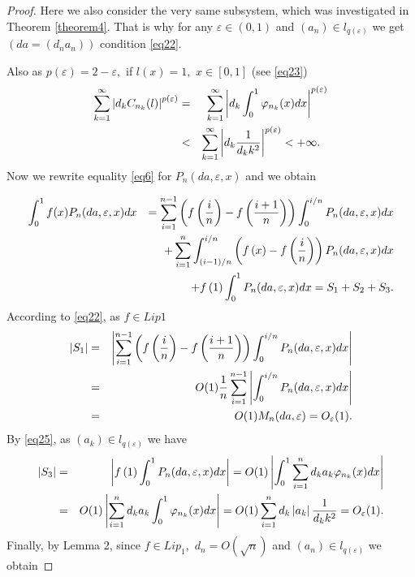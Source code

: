 \documentclass{publmathdeb}
\begin{document}
	\begin{proof}
		Here we also consider the very same subsystem, which was investigated in Theorem \ref{theorem4}. That is why for any $\varepsilon \in (0,1)$  and  $(a_n)\in l_{q(\varepsilon)}$ we get $(da=(d_n a_n))$ condition \eqref{eq22}.
		
		
		Also as $p(\varepsilon)=2-\varepsilon,$  if $l(x)=1,$ $x\in [0,1]$  (see \eqref{eq23})
		\begin{eqnarray}
			\label{eq25}  \sum_{k=1}^{\infty} \left|d_k C_{n_k} (l) \right|^{p(\varepsilon)} &=& \sum_{k=1}^{\infty} \left|d_k \int_{0}^{1} \varphi_{n_{k}}(x) dx \right|^{p(\varepsilon)} \\
			&<& \sum_{k=1}^{\infty} \left|d_k \frac{1}{d_k k^2}\right|^{p(\varepsilon)} < +\infty. \notag\ \ 
		\end{eqnarray} 
		Now we rewrite equality \eqref{eq6} for $P_n (da,\varepsilon,x)$  and we obtain
		
		\begin{eqnarray}
			\label{eq26} \int_{0}^{1} f(x) P_n (d a, \varepsilon, x) dx 
			&&= \sum_{i=1}^{n-1}\left(f\left(\frac{i}{n}\right)-f\left(\frac{i+1}{n}\right)\right)\int_{0}^{i/n}P_n(da, \varepsilon, x)dx \notag  \\
			&&+ \sum_{i=1}^{n}\int_{\left(i-1\right)/n}^{i/n}\left(f\left(x\right) -f\left(\frac{i}{n}\right)\right)P_n(da, \varepsilon, x) dx    \\
			&&+ f\left(1\right)\int_{0}^{1}P_n(da, \varepsilon, x)dx=S_1 +S_2 +S_3.  \notag  
		\end{eqnarray}
		According to \eqref{eq22}, as $f\in Lip1$ 
		\begin{eqnarray} \label{eq27}
			\left|S_1\right| &=& \left|\sum_{i=1}^{n-1}\left(f\left(\frac{i}{n}\right)-f\left(\frac{i+1}{n}\right)\right)\int_{0}^{i/n}P_n(da, \varepsilon, x)dx \right|  \\
			&=& O(1) \frac{1}{n} \sum_{i=1}^{n-1} \left|\int_{0}^{i/n}P_n(da, \varepsilon, x)dx \right| \notag  \\
			&=& O(1) M_n (da, \varepsilon) = O_{\varepsilon}(1). \notag
		\end{eqnarray} 
		By \eqref{eq25}, as $(a_k) \in l_{q(\varepsilon)}$ we have
		\begin{eqnarray} \label{eq28}
			\left|S_3\right| &=& \left|f\left(1\right)\int_{0}^{1}P_n(da, \varepsilon, x)dx\right| = O(1)  \left|\int_{0}^{1} \sum_{i=1}^{n}d_k a_k \varphi_{n_{k}}(x) dx \right| \notag\\
			&=& O(1)  \left| \sum_{i=1}^{n}d_k a_k \int_{0}^{1}\varphi_{n_{k}}(x) dx \right| 
			= O(1)  \sum_{i=1}^{n}d_k  \left|a_k \right| \frac{1}{d_k k^2} = O_{\varepsilon}(1). 
		\end{eqnarray}
		Finally, by Lemma 2, since $f\in Lip_1,$ $d_n=O(\sqrt{n})$ and $(a_n) \in l_{q(\varepsilon)}$  we obtain
		

\end{proof}
\end{document}
